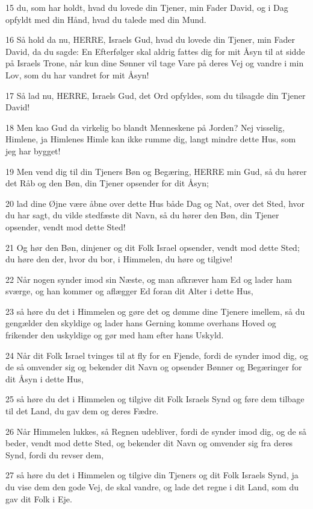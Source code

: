 \par 15 du, som har holdt, hvad du lovede din Tjener, min Fader David, og i Dag opfyldt med din Hånd, hvad du talede med din Mund.
\par 16 Så hold da nu, HERRE, Israels Gud, hvad du lovede din Tjener, min Fader David, da du sagde: En Efterfølger skal aldrig fattes dig for mit Åsyn til at sidde på Israels Trone, når kun dine Sønner vil tage Vare på deres Vej og vandre i min Lov, som du har vandret for mit Åsyn!
\par 17 Så lad nu, HERRE, Israels Gud, det Ord opfyldes, som du tilsagde din Tjener David!
\par 18 Men kao Gud da virkelig bo blandt Menneskene på Jorden? Nej visselig, Himlene, ja Himlenes Himle kan ikke rumme dig, langt mindre dette Hus, som jeg har bygget!
\par 19 Men vend dig til din Tjeners Bøn og Begæring, HERRE min Gud, så du hører det Råb og den Bøn, din Tjener opsender for dit Åsyn;
\par 20 lad dine Øjne være åbne over dette Hus både Dag og Nat, over det Sted, hvor du har sagt, du vilde stedfæste dit Navn, så du hører den Bøn, din Tjener opsender, vendt mod dette Sted!
\par 21 Og hør den Bøn, dinjener og dit Folk Israel opsender, vendt mod dette Sted; du høre den der, hvor du bor, i Himmelen, du høre og tilgive!
\par 22 Når nogen synder imod sin Næste, og man afkræver ham Ed og lader ham sværge, og han kommer og aflægger Ed foran dit Alter i dette Hus,
\par 23 så høre du det i Himmelen og gøre det og dømme dine Tjenere imellem, så du gengælder den skyldige og lader hans Gerning komme overhans Hoved og frikender den uskyldige og gør med ham efter hans Uskyld.
\par 24 Når dit Folk Israel tvinges til at fly for en Fjende, fordi de synder imod dig, og de så omvender sig og bekender dit Navn og opsender Bønner og Begæringer for dit Åsyn i dette Hus,
\par 25 så høre du det i Himmelen og tilgive dit Folk Israels Synd og føre dem tilbage til det Land, du gav dem og deres Fædre.
\par 26 Når Himmelen lukkes, så Regnen udebliver, fordi de synder imod dig, og de så beder, vendt mod dette Sted, og bekender dit Navn og omvender sig fra deres Synd, fordi du revser dem,
\par 27 så høre du det i Himmelen og tilgive din Tjeners og dit Folk Israels Synd, ja du vise dem den gode Vej, de skal vandre, og lade det regne i dit Land, som du gav dit Folk i Eje.
